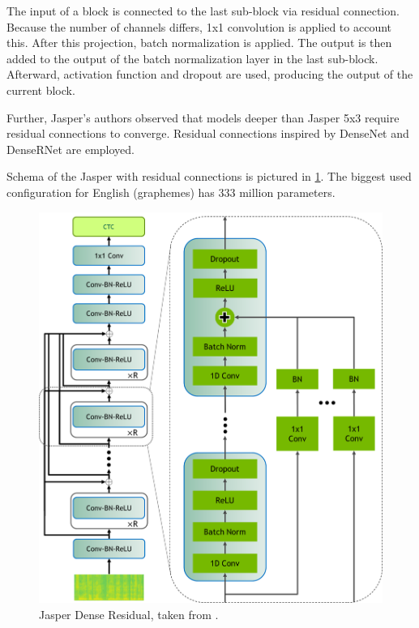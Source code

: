 The input of a block is connected to the last sub-block via residual connection. Because the number of channels differs, 1x1 convolution is applied to account this. After this projection, batch normalization is applied. The output is then added to the output of the batch normalization layer in the last sub-block. Afterward, activation function and dropout are used, producing the output of the current block.

Further, Jasper's authors observed that models deeper than Jasper 5x3 require residual connections to converge. Residual connections inspired by DenseNet  and DenseRNet  are employed.

Schema of the Jasper with residual connections is pictured in \cref{fig:jasper_dr}. The biggest used configuration for English (graphemes) has 333 million parameters.

\begin{figure}[h]
	\centering
	\includegraphics[scale=0.7]{img/JasperVerticalDR4.png}
	\caption{Jasper Dense Residual, taken from .}
	\label{fig:jasper_dr}
\end{figure}

